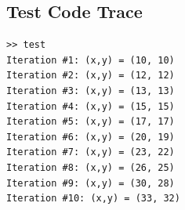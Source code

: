 \documentclass[11pt]{article} %
\begin{document}
\subsection{Test Code Trace}
\begin{verbatim}
>> test
Iteration #1: (x,y) = (10, 10)
Iteration #2: (x,y) = (12, 12)
Iteration #3: (x,y) = (13, 13)
Iteration #4: (x,y) = (15, 15)
Iteration #5: (x,y) = (17, 17)
Iteration #6: (x,y) = (20, 19)
Iteration #7: (x,y) = (23, 22)
Iteration #8: (x,y) = (26, 25)
Iteration #9: (x,y) = (30, 28)
Iteration #10: (x,y) = (33, 32)
\end{verbatim}
\end{document}
